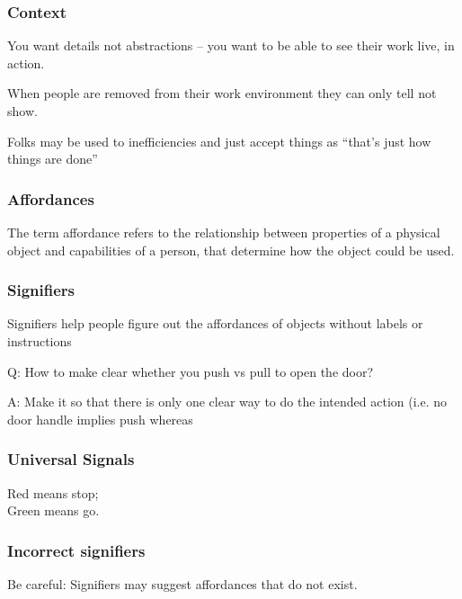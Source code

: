 \subsubsection{Context}
You want details not abstractions -- you want to be able to see their work live, in action.

When people are removed from their work environment they can only tell not show.

Folks may be used to inefficiencies and just accept things as ``that's just how things are done''

\subsubsection{Affordances}
The term affordance refers to the 
relationship between properties of a 
physical object and capabilities of a 
person, that determine how the object 
could be used.  

\subsubsection{Signifiers}
Signifiers help people figure out the 
affordances of objects without labels 
or instructions

Q: How to make clear whether you push vs pull to open the door?

A: Make it so that there is only one clear way to do the intended action (i.e. no door handle implies push whereas

\subsubsection{Universal Signals}
Red means stop;\\
Green means go.

\subsubsection{Incorrect signifiers}
\begin{important}
Be careful: Signifiers may suggest affordances that do not exist.
\end{important}
